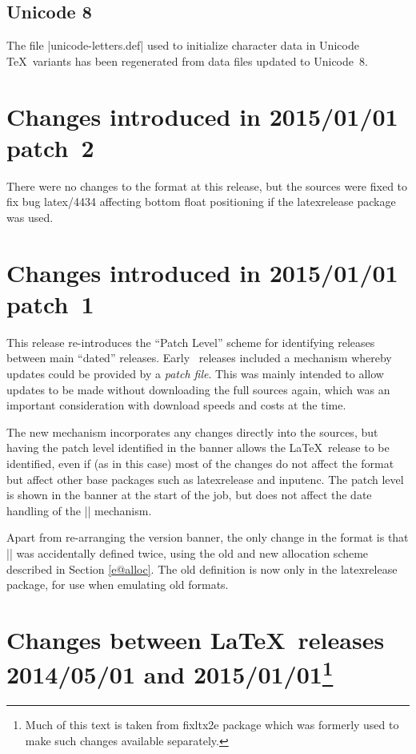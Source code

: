 \documentclass{ltxguide}
\newcommand\Lpack[1]{\mbox{\textsf{#1}}}
\begin{document}
\subsection{Unicode 8}
The file |unicode-letters.def| used to initialize character data in
Unicode \TeX\ variants has been regenerated from data files updated
to Unicode~8.

\section{Changes  introduced in 2015/01/01 patch~2}
There were no changes to the format at this release, but the sources were fixed to fix bug latex/4434
affecting bottom float positioning if the \Lpack{latexrelease} package was used.

\section{Changes  introduced in 2015/01/01 patch~1}
This release re-introduces the ``Patch Level'' scheme for identifying
releases between main ``dated'' releases. Early \LaTeXe\ releases
included a mechanism whereby updates could be provided by a
\emph{patch
  file}. This was mainly intended to allow updates to be made without
downloading the full sources again, which was an important
consideration with download speeds and costs at the time.

The new mechanism incorporates any changes directly into the sources,
but having the patch level identified in the banner allows the
\LaTeX\ release to be identified, even if (as in this case) most of the
changes do not affect the format but affect other base packages such
as \Lpack{latexrelease} and \Lpack{inputenc}. The patch level is shown
in the banner at the start of the job, but does not affect the date
handling of the |\IncludeInRelease| mechanism.

Apart from re-arranging the version banner, the only change in the
format is that |\newtoks| was accidentally defined twice, using the
old and new allocation scheme described in Section \ref{e@alloc}.
The old definition is now only in the \Lpack{latexrelease} package,
for use when emulating old formats.




\section
[Changes between  \LaTeX\ releases 2014/05/01 and 2015/01/01]
{Changes between \LaTeX\ releases 2014/05/01 and 2015/01/01\footnote{Much of this text
is taken from \Lpack{fixltx2e} package which was formerly used to make such changes available separately.}}
\end{document}
